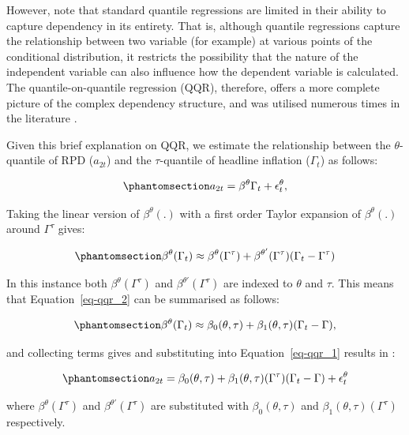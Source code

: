 \documentclass[
  letterpaper,
  DIV=11,
  numbers=noendperiod]{scrartcl}
\begin{document}
However, \citet{gupta2018} note that standard quantile regressions are
limited in their ability to capture dependency in its entirety. That is,
although quantile regressions capture the relationship between two
variable (for example) at various points of the conditional
distribution, it restricts the possibility that the nature of the
independent variable can also influence how the dependent variable is
calculated. The quantile-on-quantile regression (QQR), therefore, offers
a more complete picture of the complex dependency structure, and was
utilised numerous times in the literature
\citep[see][]{mishra2019, chang2020, sim2016}.

Given this brief explanation on QQR, we estimate the relationship
between the \(\theta\)-quantile of RPD (\(a_{2t}\)) and the
\(\tau\)-quantile of headline inflation (\(\Gamma_t\)) as follows:

\begin{equation}\phantomsection\label{eq-qqr_1}{
    a_{2t} = \beta^\theta\Gamma_t + \epsilon_{t}^\theta, 
}\end{equation}

Taking the linear version of \(\beta^\theta(.)\) with a first order
Taylor expansion of \(\beta^\theta(.)\) around \(\Gamma^\tau\) gives:

\begin{equation}\phantomsection\label{eq-qqr_2}{
    \beta^\theta(\Gamma_t) \approx \beta^\theta(\Gamma^\tau) + \beta^{\theta'}(\Gamma^\tau)(\Gamma_t - \Gamma^\tau)
}\end{equation}

In this instance both \(\beta^\theta(\Gamma^\tau)\) and
\(\beta^{\theta'}(\Gamma^\tau)\) are indexed to \(\theta\) and \(\tau\).
This means that Equation~\ref{eq-qqr_2} can be summarised as follows:

\begin{equation}\phantomsection\label{eq-qqr_3}{
    \beta^\theta(\Gamma_t) \approx \beta_0(\theta, \tau) + \beta_1(\theta, \tau)(\Gamma_t - \Gamma),
}\end{equation}

and collecting terms gives and substituting into Equation~\ref{eq-qqr_1}
results in :

\begin{equation}\phantomsection\label{eq-qqr_4}{
a_{2t} =  \beta_0(\theta, \tau) + \beta_1(\theta, \tau)(\Gamma^\tau)(\Gamma_t - \Gamma) + \epsilon_{t}^\theta
}\end{equation}

where \(\beta^\theta(\Gamma^\tau)\) and \(\beta^{\theta'}(\Gamma^\tau)\)
are substituted with \(\beta_0(\theta, \tau)\) and
\(\beta_1(\theta, \tau)(\Gamma^\tau)\) respectively.
\end{document}
